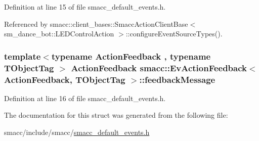 Definition at line 15 of file smacc\+\_\+default\+\_\+events.\+h.



Referenced by smacc\+::client\+\_\+bases\+::\+Smacc\+Action\+Client\+Base$<$ sm\+\_\+dance\+\_\+bot\+::\+L\+E\+D\+Control\+Action $>$\+::configure\+Event\+Source\+Types().

\subsubsection[{\texorpdfstring{feedback\+Message}{feedbackMessage}}]{\setlength{\rightskip}{0pt plus 5cm}template$<$typename Action\+Feedback , typename T\+Object\+Tag $>$ Action\+Feedback {\bf smacc\+::\+Ev\+Action\+Feedback}$<$ Action\+Feedback, T\+Object\+Tag $>$\+::feedback\+Message}\hypertarget{structsmacc_1_1EvActionFeedback_ae00f5e85eb9cec0d02ca394460d60015}{}\label{structsmacc_1_1EvActionFeedback_ae00f5e85eb9cec0d02ca394460d60015}


Definition at line 16 of file smacc\+\_\+default\+\_\+events.\+h.



The documentation for this struct was generated from the following file\+:\begin{DoxyCompactItemize}
\item 
smacc/include/smacc/\hyperlink{smacc__default__events_8h}{smacc\+\_\+default\+\_\+events.\+h}\end{DoxyCompactItemize}
